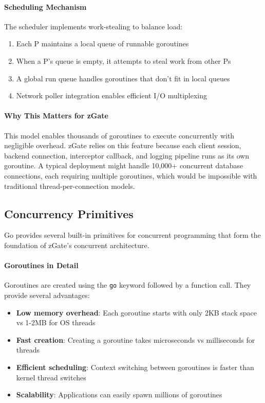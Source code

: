 \paragraph{Scheduling Mechanism}
The scheduler implements work-stealing to balance load:
\begin{enumerate}
    \item Each P maintains a local queue of runnable goroutines
    \item When a P's queue is empty, it attempts to steal work from other Ps
    \item A global run queue handles goroutines that don't fit in local queues
    \item Network poller integration enables efficient I/O multiplexing
\end{enumerate}

\paragraph{Why This Matters for zGate}
This model enables thousands of goroutines to execute concurrently with negligible overhead. zGate relies on this feature because each client session, backend connection, interceptor callback, and logging pipeline runs as its own goroutine. A typical deployment might handle 10,000+ concurrent database connections, each requiring multiple goroutines, which would be impossible with traditional thread-per-connection models.

\subsection{Concurrency Primitives}

Go provides several built-in primitives for concurrent programming that form the foundation of zGate's concurrent architecture.

\paragraph{Goroutines in Detail}

Goroutines are created using the \texttt{go} keyword followed by a function call. They provide several advantages:

\begin{itemize}
    \item \textbf{Low memory overhead}: Each goroutine starts with only 2KB stack space vs 1-2MB for OS threads
    \item \textbf{Fast creation}: Creating a goroutine takes microseconds vs milliseconds for threads
    \item \textbf{Efficient scheduling}: Context switching between goroutines is faster than kernel thread switches
    \item \textbf{Scalability}: Applications can easily spawn millions of goroutines
\end{itemize}

